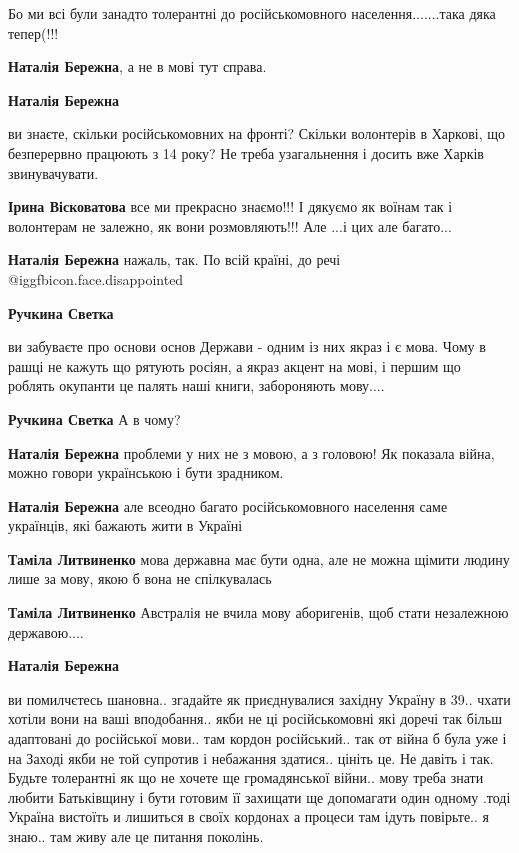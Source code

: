 \begin{itemize}
Бо ми всі були занадто толерантні до російськомовного населення.......така дяка
тепер(!!!

\begin{itemize} %
\textbf{Наталія Бережна}, а не в мові тут справа.

\textbf{Наталія Бережна}

ви знаєте, скільки російськомовних на фронті? Скільки волонтерів в Харкові, що
безперервно працюють з 14 року? Не треба узагальнення і досить вже Харків
звинувачувати.

\textbf{Ірина Вісковатова} все ми прекрасно знаємо!!! І дякуємо як воїнам так і волонтерам не залежно, як вони розмовляють!!! Але ...і цих але багато...

\textbf{Наталія Бережна} нажаль, так. По всій країні, до речі  @igg{fbicon.face.disappointed} 

\textbf{Ручкина Светка} 

ви забуваєте про основи основ Держави - одним із них якраз і є мова. Чому в
рашці не кажуть що рятують росіян, а якраз акцент на мові, і першим що роблять
окупанти це палять наші книги, забороняють мову....

\textbf{Ручкина Светка} А в чому?

\textbf{Наталія Бережна} проблеми у них не з мовою, а з головою! Як показала війна, можно говори українською і бути зрадником.

\textbf{Наталія Бережна} але всеодно багато російськомовного населення саме українців, які бажають жити в Україні

\textbf{Таміла Литвиненко} мова державна має бути одна, але не можна щімити людину лише за мову, якою б вона не спілкувалась

\textbf{Таміла Литвиненко} Австралія не вчила мову аборигенів, щоб стати незалежною державою....

\textbf{Наталія Бережна} 

ви помилчєтесь шановна.. згадайте як приєднувалися західну Україну в 39.. чхати
хотіли вони на ваші вподобання.. якби не ці російськомовні які доречі так більш
адаптовані до російської мови.. там кордон російський.. так от війна б була уже
і на Заході якби не той супротив і небажання здатися.. цініть це. Не давіть і
так. Будьте толерантні як що не хочете ще громадянської війни.. мову треба знати
любити Батьківщину і бути готовим її захищати ще допомагати один одному .тоді
Україна вистоїть и лишиться в своїх кордонах а процеси там ідуть повірьте.. я
знаю.. там живу але це питання поколінь.


\end{itemize}
\end{itemize}
